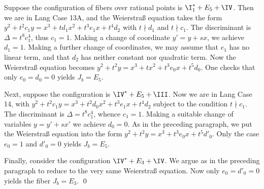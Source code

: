 Suppose the configuration of fibers over rational points is $\I_1^*+E_5+\IV$.
Then we are in Lang Case 13A, and the Weierstra\ss{} equation takes the form
$y^2+t^2c_1y=x^3+td_1x^2+t^3e_1x+t^4d_2$ with $t\nmid d_1$ and $t\nmid c_1$.
The discriminant is $\Delta=t^8c_1^4$, thus $c_1=1$. Making a change of coordinate $y'=y+sx$,
we achieve $d_1=1$. Making a further change of coordinates, we may assume
that $e_1$ has no linear term, and that $d_2$ has neither constant nor quadratic term.
Now the Weierstra\ss{} equation becomes $y^2+t^2y=x^3+tx^2+t^3e_0x+t^5d_0$.
One checks that only $e_0=d_0=0$ yields $J_b=E_5$.

Next, suppose the configuration is $\IV^*+E_5+ \III$.
Now we are in Lang Case 14, with $y^2+t^2c_1y=x^3+t^2d_0x^2+t^3e_1x+t^4d_2$ subject to
the condition $t\nmid c_1$. The discriminant is $\Delta=t^8c_1^4$, whence $c_1=1$.
Making a suitable change of variables $y=y'+sx'$ we   achieve $d_0=0$.
As in the preceding paragraph, we put the Weierstra\ss{} equation into
the form $y^2+t^2y=x^3+t^3e_0x+t^5d'_0$.
Only the case $e_0=1$ and $d'_0=0$ yields $J_b=E_5$.

Finally, consider the configuration $\IV^*+E_3+\IV$.
We argue as in the preceding paragraph to reduce to the very same   Weierstra\ss{} equation.
Now only $e_0=d'_0=0$ yields the fiber $J_b=E_3$.
\qed



